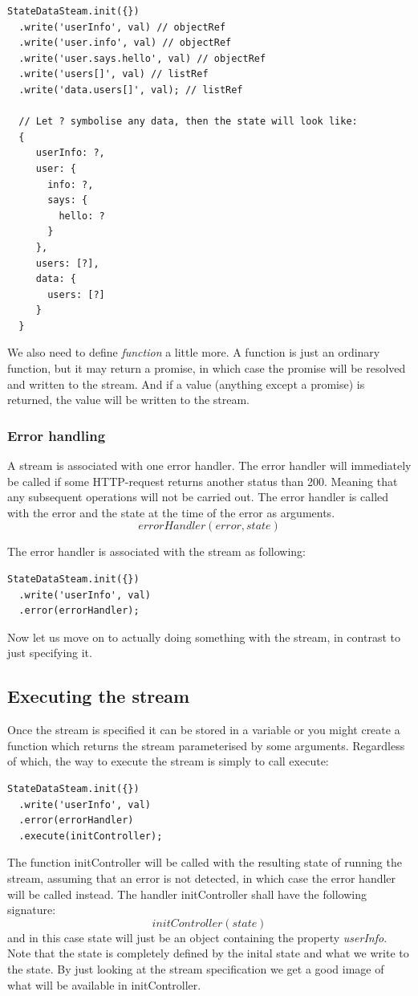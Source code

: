 \documentclass[a4paper,12pt]{article}
\begin{document}
\begin{lstlisting}[caption=Examples of listRef and objectRef keys, frame=single]
StateDataSteam.init({})
  .write('userInfo', val) // objectRef
  .write('user.info', val) // objectRef
  .write('user.says.hello', val) // objectRef
  .write('users[]', val) // listRef
  .write('data.users[]', val); // listRef

  // Let ? symbolise any data, then the state will look like:
  {
     userInfo: ?,
     user: {
       info: ?,
       says: {
         hello: ?
       }
     },
     users: [?],
     data: {
       users: [?]
     }
  }
\end{lstlisting}
We also need to define \emph{function} a little more. A function is just an ordinary function, but it may return a promise, in which case the promise will be resolved and written to
the stream. And if a value (anything except a promise) is returned, the value will be written to the stream.

\subsubsection{Error handling}
A stream is associated with one error handler. The error handler will immediately be called if some HTTP-request returns another status than 200. Meaning that any subsequent
operations will not be carried out. The error handler is called with the error and the state at the time of the error as arguments.
\[ errorHandler(error, state) \]

The error handler is associated with the stream as following:
\begin{lstlisting}[caption=Attaching an error handler to the stream, frame=single]
StateDataSteam.init({})
  .write('userInfo', val)
  .error(errorHandler);
\end{lstlisting}
Now let us move on to actually doing something with the stream, in contrast to just specifying it.

\subsection{Executing the stream}
Once the stream is specified it can be stored in a variable or you might create a function which returns the stream parameterised by some arguments.
Regardless of which, the way to execute the stream is simply to call execute:

\begin{lstlisting}[caption=Executing the stream, frame=single]
StateDataSteam.init({})
  .write('userInfo', val)
  .error(errorHandler)
  .execute(initController);
\end{lstlisting}
The function initController will be called with the resulting state of running the stream, assuming that an error is not detected, in which case the error handler will be called instead. 
The handler initController shall have the following signature:
\[ initController(state) \]
and in this case state will just be an object containing the property \emph{userInfo}. Note that the state is completely defined by the inital state and what we write to the state.
By just looking at the stream specification we get a good image of what will be available in initController.
\end{document}
